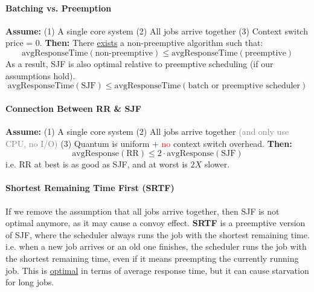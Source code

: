 \documentclass[openany,12pt]{book}
\newcommand{\red}[1]{\textcolor{Red}{#1}}
\newcommand{\gray}[1]{\textcolor{gray}{#1}}
\begin{document}
\begin{samepage}
  \paragraph{Batching vs. Preemption} \textbf{Assume:} (1) A single core system (2) All jobs arrive together (3) Context switch price = 0. \textbf{Then:} There \ul{exists} a non-preemptive algorithm such that:
  \begin{equation*}
    \text{avgResponseTime}(\text{non-preemptive}) \leq \text{avgResponseTime}(\text{preemptive})
  \end{equation*}
  As a result, SJF is also optimal relative to preemptive scheduling (if our assumptions hold).
  \begin{equation*}
    \text{avgResponseTime}(\text{SJF}) \leq \text{avgResponseTime}(\text{batch or preemptive scheduler})
  \end{equation*}
\end{samepage}


\paragraph{Connection Between RR \& SJF} \textbf{Assume:} (1) A single core system (2) All jobs arrive together \gray{(and only use CPU, no I/O)} (3) Quantum is uniform + \red{no} context switch overhead. \textbf{Then:}
\begin{equation*}
  \text{avgResponse}(\text{RR}) \leq 2\cdot \text{avgResponse}(\text{SJF})
\end{equation*}
i.e. RR at best is as good as SJF, and at worst is \(2X\) slower.


\paragraph{Shortest Remaining Time First (SRTF)} If we remove the assumption that all jobs arrive together, then SJF is not optimal anymore, as it may cause a convoy effect. \textbf{SRTF} is a preemptive version of SJF, where the scheduler always runs the job with the shortest remaining time. i.e. when a new job arrives or an old one finishes, the scheduler runs the job with the shortest remaining time, even if it means preempting the currently running job. This is \ul{optimal} in terms of average response time, but it can cause starvation for long jobs.
\end{document}
